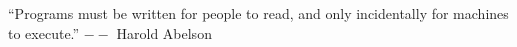 
\thispagestyle{empty}
“Programs must be written for people to read, and only incidentally for machines to execute.”
$--$ Harold Abelson
